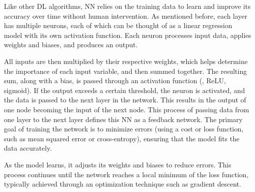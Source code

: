 Like other DL algorithms, NN relies on the training data to learn and improve its accuracy over time without human intervention.
As mentioned before, each layer has multiple neurons, each of which can be thought of as a linear regression model with its own activation function.
Each neuron processes input data, applies weights and biases, and produces an output.

All inputs are then multiplied by their respective weights, which helps determine the importance of each input variable, and then summed together.
The resulting sum, along with a bias, is passed through an activation function (\eg{}, ReLU, sigmoid).
If the output exceeds a certain threshold, the neuron is activated, and the data is passed to the next layer in the network.
This results in the output of one node becoming the input of the next node.
This process of passing data from one layer to the next layer defines this NN as a feedback network.
The primary goal of training the network is to minimize errors (using a cost or loss function, such as mean squared error or cross-entropy), ensuring that the model fits the data accurately.

As the model learns, it adjusts its weights and biases to reduce errors.
This process continues until the network reaches a local minimum of the loss function, typically achieved through an optimization technique such as gradient descent.

